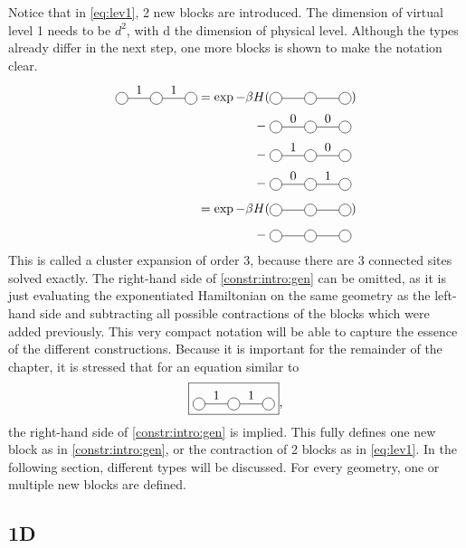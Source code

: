 \documentclass[twocolumn]{article}
\newcounter{a}
\newcounter{b}
\begin{document}
Notice that in \cref{eq:lev1}, 2 new blocks are introduced. The dimension of virtual level 1 needs to be $d^2$, with d the dimension of physical level. Although the types already differ in the next step, one more blocks is shown to make the notation clear.
\begin{equation}\label{constr:intro:gen}
    \begin{split}
        \mpob{3}{ {0,1,1,0}  }{}{}{}{{,,,}}  = \exp  -\beta H( &\mpob{3}{ {,,,} }{}{}{}{{,,}})  \\
        - \;&\mpob{3}{ {0,0,0,0}  }{}{}{}{{,,,}}\\
        - \; &\mpob{3}{ {0,1,0,0}  }{}{}{}{{,,,}}\\
        - \; &\mpob{3}{ {0,0,1,0}  }{}{}{}{{,,,}}\\[4pt]
        =\exp  -\beta H( &\mpob{3}{ {,,,} }{}{}{}{{,,}})\\[4pt]
        - \; &\mpob{3}{ {,,,}  }{}{}{}{{,,,}}\\
    \end{split}
\end{equation}
This is called a cluster expansion of order 3, because there are 3 connected sites solved exactly. The right-hand side of \cref{constr:intro:gen} can be omitted, as it is just evaluating the exponentiated Hamiltonian on the same geometry as the left-hand side and subtracting all possible contractions of the blocks which were added previously. This very compact notation will be able to capture the essence of the different constructions. Because it is important for the remainder of the chapter, it is stressed that for an equation similar to
\begin{equation}
    \boxed{\mpob{3}{ {0,1,1,0}  }{}{}{}{{,,,}} },
\end{equation}
the right-hand side of \cref{constr:intro:gen} is implied. This fully defines one new block as in \cref{constr:intro:gen}, or the contraction of 2 blocks as in \cref{eq:lev1}. In the following section, different types will be discussed. For every geometry, one or multiple new blocks are defined.

\subsection{1D}
\end{document}
